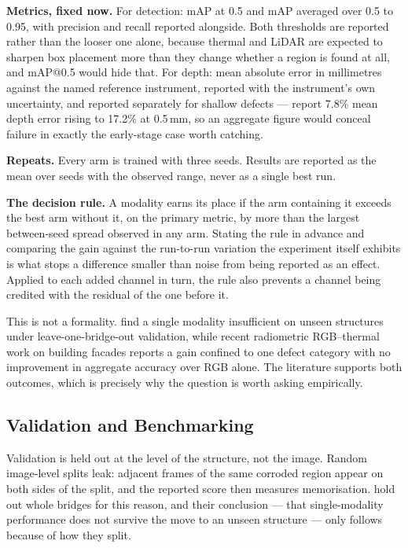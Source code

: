 \textbf{Metrics, fixed now.} For detection: mAP at 0.5 and mAP averaged
over 0.5 to 0.95, with precision and recall reported alongside. Both
thresholds are reported rather than the looser one alone, because thermal and
LiDAR are expected to sharpen box placement more than they change whether a
region is found at all, and mAP@0.5 would hide that. For depth: mean
absolute error in millimetres against the named reference instrument, reported
with the instrument's own uncertainty, and reported separately for shallow
defects --- \citet{Maru2025} report 7.8\% mean depth error rising to
17.2\% at 0.5\,mm, so an aggregate figure would
conceal failure in exactly the early-stage case worth catching.

\textbf{Repeats.} Every arm is trained with three seeds. Results are reported as
the mean over seeds with the observed range, never as a single best run.

\textbf{The decision rule.} A modality earns its place if the arm containing it
exceeds the best arm without it, on the primary metric, by more than the largest
between-seed spread observed in any arm. Stating the rule in advance and
comparing the gain against the run-to-run variation the experiment itself
exhibits is what stops a difference smaller than noise from being reported as an
effect. Applied to each added channel in turn, the rule also prevents a channel
being credited with the residual of the one before it.

This is not a formality. \citet{Rashidi2026} find a single modality insufficient
on unseen structures under leave-one-bridge-out validation, while recent
radiometric RGB--thermal work on building facades reports a gain confined to one
defect category with no improvement in aggregate accuracy over RGB alone. The
literature supports both outcomes, which is precisely why the question is worth
asking empirically.

\subsection{Validation and Benchmarking}

Validation is held out at the level of the structure, not the image. Random
image-level splits leak: adjacent frames of the same corroded region appear on
both sides of the split, and the reported score then measures memorisation.
\citet{Rashidi2026} hold out whole bridges for this reason, and their conclusion
--- that single-modality performance does not survive the move to an unseen
structure --- only follows because of how they split.

